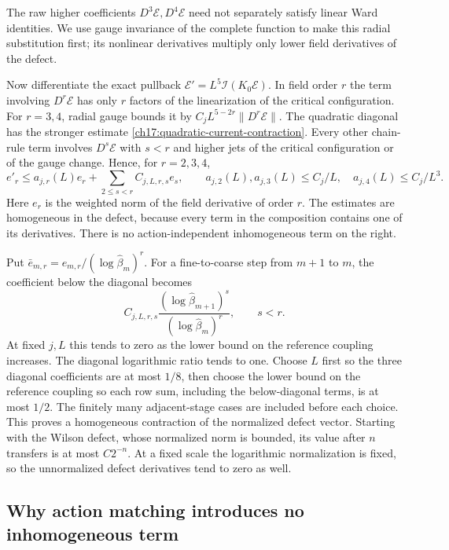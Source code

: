 The raw higher coefficients $D^3\mathcal E,D^4\mathcal E$ need not
separately satisfy linear Ward identities. We use gauge invariance of
the complete function to make this radial substitution first; its
nonlinear derivatives multiply only lower field derivatives of the
defect.

Now differentiate the exact pullback $\mathcal E'=L^5\mathcal I(K_0\mathcal E)$.
In field order $r$ the term involving $D^r\mathcal E$ has only $r$
factors of the linearization of the critical configuration. For $r=3,4$, radial gauge bounds it by
$C_jL^{5-2r}\|D^r\mathcal E\|$. The quadratic diagonal has the
stronger estimate \eqref{ch17:quadratic-current-contraction}.
Every other chain-rule term involves $D^s\mathcal E$ with $s<r$
and higher jets of the critical configuration or of the gauge change. Hence, for $r=2,3,4$,
\begin{equation}
 e'_r\le a_{j,r}(L)e_r+\sum_{2\le s<r}C_{j,L,r,s}e_s,
 \qquad
 a_{j,2}(L),a_{j,3}(L)\le C_j/L,
 \quad a_{j,4}(L)\le C_j/L^3.
 \label{ch17:unnormalized-defect}
\end{equation}
Here $e_r$ is the weighted norm of the field derivative of order $r$.
The estimates are homogeneous in the defect, because every term in the
composition contains one of its derivatives. There is no action-independent
inhomogeneous term on the right.

Put $\bar e_{m,r}=e_{m,r}/(\log\widehat\beta_m)^r$. For a fine-to-coarse
step from $m+1$ to $m$, the coefficient below the diagonal becomes
\[
 C_{j,L,r,s}
       \frac{(\log\widehat\beta_{m+1})^s}
            {(\log\widehat\beta_m)^r},\qquad s<r.
\]
At fixed $j,L$ this tends to zero as the lower bound on the reference coupling increases.
The diagonal logarithmic ratio tends to one. Choose $L$ first so the
three diagonal coefficients are at most $1/8$, then choose the lower bound on the reference coupling
so each row sum, including the below-diagonal terms, is at most $1/2$.
The finitely many adjacent-stage cases are included before each choice.
This proves a homogeneous contraction of the normalized defect vector.
Starting with the Wilson defect, whose normalized norm is bounded, its
value after $n$ transfers is at most $C2^{-n}$. At a fixed scale
the logarithmic normalization is fixed, so the unnormalized
defect derivatives tend to zero as well.

\subsection{Why action matching introduces no inhomogeneous term}

